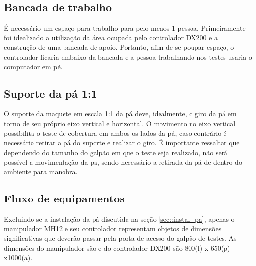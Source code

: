 \subsection{Bancada de trabalho}
É necessário um espaço para trabalho para pelo menos 1 pessoa.
Primeiramente foi idealizado a utilização da área ocupada pelo controlador DX200
e a construção de uma bancada de apoio. 
Portanto, afim de se poupar espaço, o
controlador ficaria embaixo da bancada e a pessoa trabalhando nos testes usaria
o computador em pé.

 \subsection{Suporte da pá 1:1}
 O suporte da maquete em escala 1:1 da pá deve, idealmente, o giro da pá em
 torno de seu próprio eixo vertical e horizontal. 
 O movimento no eixo vertical possibilita o teste de cobertura em ambos os lados
 da pá, caso contrário é necessário retirar a pá do suporte e realizar o giro.
 É importante ressaltar que dependendo do tamanho do galpão em que o teste seja
 realizado, não será possível a movimentação da pá, sendo necessário a retirada
 da pá de dentro do ambiente para manobra.
 
 \subsection{Fluxo de equipamentos}
Excluindo-se a instalação da pá discutida na seção \ref{sec::instal_pa}, apenas
o manipulador MH12 e seu controlador representam objetos de dimensões
significativas que deverão passar pela porta de acesso do galpão de testes.
As dimensões do manipulador são e do controlador DX200 são 800(l)   x  650(p) 
x1000(a). 
